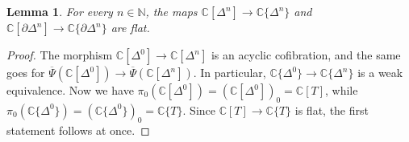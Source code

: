 \documentclass[12pt,a4paper,reqno]{amsart}
\theoremstyle{plain}
\newtheorem{lem}[thm]{Lemma}
\theoremstyle{definition}
\theoremstyle{remark}
\numberwithin{equation}{section}
\begin{document}
\begin{lem} \label{lem:flatness_of_the_boundary}
	For every $n \in \mathbb N$, the maps $\mathbb C[\Delta^n] \to \mathbb C\{\Delta^n\}$ and $\mathbb C[\partial \Delta^n] \to \mathbb C\{\partial \Delta^n\}$ are flat.
\end{lem}
	
\begin{proof}
	The morphism $\mathbb C[\Delta^0] \to \mathbb C[\Delta^n]$ is an acyclic cofibration, and the same goes for $\overline{\Psi}(\mathbb C[\Delta^0]) \to \overline{\Psi}(\mathbb C[\Delta^n])$.
	In particular, $\mathbb C\{\Delta^0\} \to \mathbb C\{\Delta^n\}$ is a weak equivalence.
	Now we have $\pi_0(\mathbb C[\Delta^0]) = (\mathbb C[\Delta^0])_0 = \mathbb C[T]$, while $\pi_0(\mathbb C\{\Delta^0\}) = (\mathbb C\{\Delta^0\})_0 = \mathbb C\{T\}$. Since $\mathbb C[T] \to \mathbb C\{T\}$ is flat, the first statement follows at once.


\end{proof}
\end{document}
